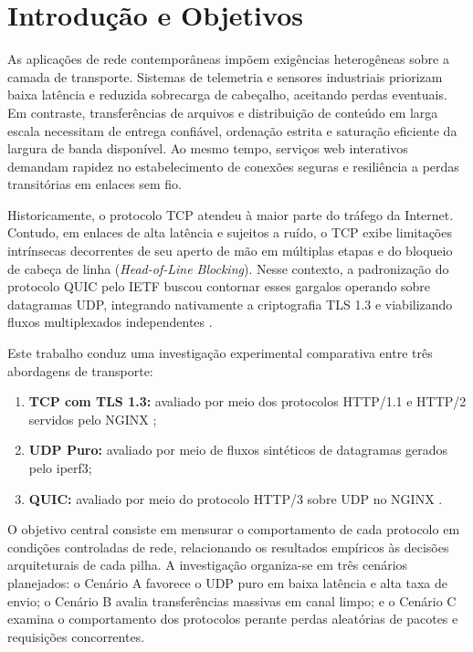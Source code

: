 \documentclass[12pt]{article}
\begin{document}
\section{Introdução e Objetivos}

As aplicações de rede contemporâneas impõem exigências heterogêneas sobre a camada de transporte. Sistemas de telemetria e sensores industriais priorizam baixa latência e reduzida sobrecarga de cabeçalho, aceitando perdas eventuais. Em contraste, transferências de arquivos e distribuição de conteúdo em larga escala necessitam de entrega confiável, ordenação estrita e saturação eficiente da largura de banda disponível. Ao mesmo tempo, serviços web interativos demandam rapidez no estabelecimento de conexões seguras e resiliência a perdas transitórias em enlaces sem fio.

Historicamente, o protocolo TCP atendeu à maior parte do tráfego da Internet. Contudo, em enlaces de alta latência e sujeitos a ruído, o TCP exibe limitações intrínsecas decorrentes de seu aperto de mão em múltiplas etapas e do bloqueio de cabeça de linha (\emph{Head-of-Line Blocking}). Nesse contexto, a padronização do protocolo QUIC pelo IETF buscou contornar esses gargalos operando sobre datagramas UDP, integrando nativamente a criptografia TLS 1.3 e viabilizando fluxos multiplexados independentes \cite{rfc9000,rfc9001}.

Este trabalho conduz uma investigação experimental comparativa entre três abordagens de transporte:
\begin{enumerate}[label=\alph*)]
  \item \textbf{TCP com TLS 1.3:} avaliado por meio dos protocolos HTTP/1.1 e HTTP/2 servidos pelo NGINX \cite{rfc9113};
  \item \textbf{UDP Puro:} avaliado por meio de fluxos sintéticos de datagramas gerados pelo iperf3;
  \item \textbf{QUIC:} avaliado por meio do protocolo HTTP/3 sobre UDP no NGINX \cite{rfc9114}.
\end{enumerate}

O objetivo central consiste em mensurar o comportamento de cada protocolo em condições controladas de rede, relacionando os resultados empíricos às decisões arquiteturais de cada pilha. A investigação organiza-se em três cenários planejados: o Cenário A favorece o UDP puro em baixa latência e alta taxa de envio; o Cenário B avalia transferências massivas em canal limpo; e o Cenário C examina o comportamento dos protocolos perante perdas aleatórias de pacotes e requisições concorrentes.
\end{document}
